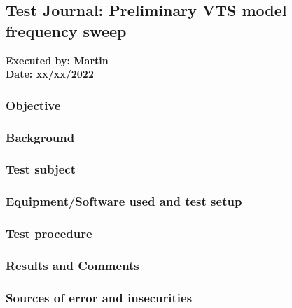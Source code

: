 \subsection{Test Journal: Preliminary VTS model frequency sweep} \label{app:tj_01}

\textbf{Executed by: Martin} \\
\textbf{Date: xx/xx/2022}

\subsubsection{Objective}


\subsubsection{Background}


\subsubsection{Test subject}


\subsubsection{Equipment/Software used and test setup}


\subsubsection{Test procedure}


\subsubsection{Results and Comments}


\subsubsection{Sources of error and insecurities}
